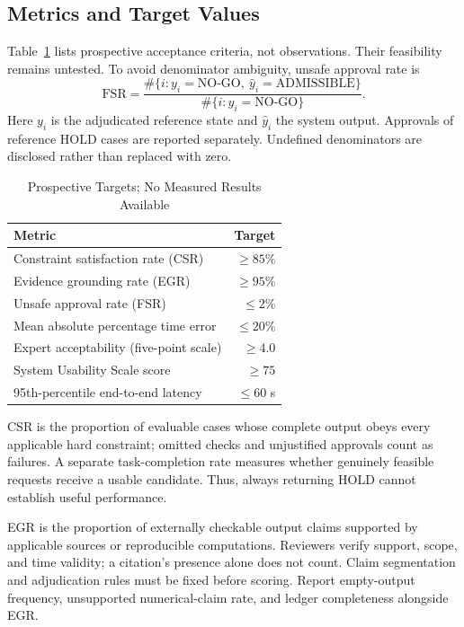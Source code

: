 \documentclass[conference]{IEEEtran}
\begin{document}
\subsection{Metrics and Target Values}
Table~\ref{tab:metrics} lists prospective acceptance criteria, not observations. Their feasibility remains untested. To avoid denominator ambiguity, unsafe approval rate is
\begin{equation}
 \mathrm{FSR}=\frac{\#\{i:y_i=\text{NO-GO},\ \hat y_i=\text{ADMISSIBLE}\}}
 {\#\{i:y_i=\text{NO-GO}\}}.
\end{equation}
Here $y_i$ is the adjudicated reference state and $\hat y_i$ the system output. Approvals of reference HOLD cases are reported separately. Undefined denominators are disclosed rather than replaced with zero.

\begin{table}[t]
\caption{Prospective Targets; No Measured Results Available}
\label{tab:metrics}
\centering\footnotesize
\begin{tabular}{@{}p{}r@{}}
\toprule
Metric & Target\\
\midrule
Constraint satisfaction rate (CSR) & $\geq85\%$\\
Evidence grounding rate (EGR) & $\geq95\%$\\
Unsafe approval rate (FSR) & $\leq2\%$\\
Mean absolute percentage time error & $\leq20\%$\\
Expert acceptability (five-point scale) & $\geq4.0$\\
System Usability Scale score & $\geq75$\\
95th-percentile end-to-end latency & $\leq60$ s\\
\bottomrule
\end{tabular}
\end{table}

CSR is the proportion of evaluable cases whose complete output obeys every applicable hard constraint; omitted checks and unjustified approvals count as failures. A separate task-completion rate measures whether genuinely feasible requests receive a usable candidate. Thus, always returning HOLD cannot establish useful performance.

EGR is the proportion of externally checkable output claims supported by applicable sources or reproducible computations. Reviewers verify support, scope, and time validity; a citation's presence alone does not count. Claim segmentation and adjudication rules must be fixed before scoring. Report empty-output frequency, unsupported numerical-claim rate, and ledger completeness alongside EGR.
\end{document}
